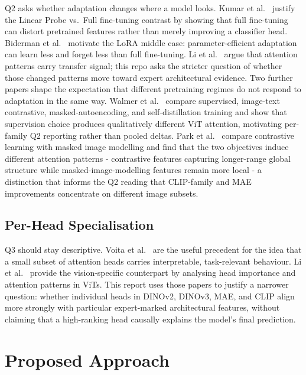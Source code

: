 \documentclass{article}
\begin{document}
Q2 asks whether adaptation changes where a model looks. Kumar et
al.~\cite{Kumar22Distort} justify the Linear Probe vs.\ Full fine-tuning
contrast by showing that full fine-tuning can distort pretrained features rather
than merely improving a classifier head. Biderman et al.~\cite{Biderman24LoRA}
motivate the LoRA middle case: parameter-efficient adaptation can learn less and
forget less than full fine-tuning. Li et al.~\cite{Li24AttnTransfer} argue that
attention patterns carry transfer signal; this repo asks the stricter question of
whether those changed patterns move toward expert architectural evidence.
Two further papers shape the expectation that different pretraining regimes do
not respond to adaptation in the same way. Walmer et
al.~\cite{Walmer23Teaching} compare supervised, image-text contrastive,
masked-autoencoding, and self-distillation training and show that supervision
choice produces qualitatively different ViT attention, motivating per-family
Q2 reporting rather than pooled deltas. Park et al.~\cite{Park23SSLViT}
compare contrastive learning with masked image modelling and find that the two
objectives induce different attention patterns - contrastive features
capturing longer-range global structure while masked-image-modelling features
remain more local - a distinction that informs the Q2 reading that
CLIP-family and MAE improvements concentrate on different image subsets.

\subsection{Per-Head Specialisation}

Q3 should stay descriptive. Voita et al.~\cite{Voita19Heads} are the useful
precedent for the idea that a small subset of attention heads carries
interpretable, task-relevant behaviour. Li et al.~\cite{Li23HeadDist} provide
the vision-specific counterpart by analysing head importance and attention
patterns in ViTs. This report uses those papers to justify a narrower question:
whether individual heads in DINOv2, DINOv3, MAE, and CLIP align more strongly
with particular expert-marked architectural features, without claiming that a
high-ranking head causally explains the model's final prediction.

\section{Proposed Approach}
\label{sec:approach}
\end{document}
